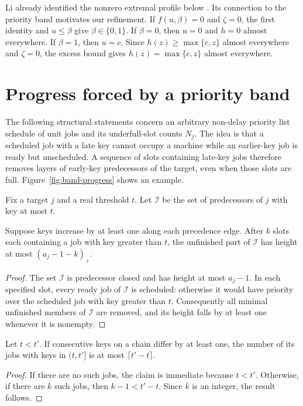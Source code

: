 Li already identified the nonzero extremal profile below
\cite[Section~3]{Li2017}. Its connection to the priority band motivates
our refinement. If
$f(u,\beta)=0$ and $\zeta=0$, the first identity and $u\le\beta$ give
$\beta\in\{0,1\}$. If $\beta=0$, then $u=0$ and $h=0$ almost everywhere.
If $\beta=1$, then $u=c$. Since $h(z)\ge\max\{c,z\}$ almost everywhere
and $\zeta=0$, the excess bound gives $h(z)=\max\{c,z\}$ almost everywhere.

\section{Progress forced by a priority band}
The following structural statements concern an arbitrary non-delay priority
list schedule of unit jobs and its underfull-slot counts $N_j$. The idea is that a scheduled job with a late key cannot
occupy a machine while an earlier-key job is ready but unscheduled. A sequence of slots
containing late-key jobs therefore removes layers of early-key predecessors
of the target, even when those slots are full. Figure~\ref{fig:band-progress}
shows an example.


Fix a target $j$ and a real threshold $t$. Let $\mathcal I$ be the
set of predecessors of $j$ with key at most $t$.

\begin{lemma}
\label{lem:early-ancestor-progress}
Suppose keys increase by at least one along each precedence edge.
After $k$ slots each containing a job with key greater than $t$,
the unfinished part of $\mathcal I$ has height at most $(a_j-1-k)_+$.
\end{lemma}
\begin{proof}
The set $\mathcal I$ is predecessor closed and has height at most $a_j-1$. In
each specified slot, every ready job of $\mathcal I$ is scheduled: otherwise it
would have priority over the scheduled job with key greater than $t$.
Consequently all minimal unfinished members of $\mathcal I$ are removed, and
its height falls by at least one whenever it is nonempty.
\end{proof}

\begin{lemma}
\label{lem:chain-in-band}
Let $t<t'$. If consecutive keys on a chain differ by at least one, the number of
its jobs with keys in $(t,t']$ is at most $\lceil t'-t\rceil$.
\end{lemma}
\begin{proof}
If there are no such jobs, the claim is immediate because $t<t'$.
Otherwise, if there are $k$ such jobs, then $k-1<t'-t$. Since $k$ is an
integer, the result follows.
\end{proof}


